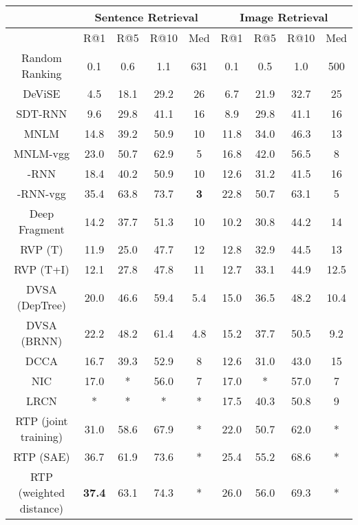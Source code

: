 \documentclass[10pt,twocolumn,letterpaper]{article}
\begin{document}
\begin{table*} \small
\begin{center}
\begin{tabular}{c|cccc|cccc}
    \hline
          & \multicolumn{4}{|c|}{Sentence Retrieval} & \multicolumn{4}{|c}{Image Retrieval}  \\
          \hline
          \hline
        & R@1 & R@5 & R@10 & Med  & R@1 & R@5 & R@10 & Med  \\
        \hline
        \hline
        Random Ranking & 0.1 & 0.6 & 1.1 & 631 & 0.1 & 0.5  & 1.0 & 500\\
DeViSE \cite{frome_nips2013}& 4.5 & 18.1 & 29.2 & 26 & 6.7 & 21.9  & 32.7 & 25\\
SDT-RNN \cite{socher_tacl2014}& 9.6 & 29.8 & 41.1 & 16 & 8.9 & 29.8  & 41.1 & 16\\
MNLM \cite{kiros_2014}& 14.8 & 39.2 & 50.9 & 10 & 11.8 & 34.0  & 46.3 & 13\\
MNLM-vgg \cite{kiros_2014}& 23.0 & 50.7 & 62.9 & 5 & 16.8 & 42.0  & 56.5 & 8\\
-RNN \cite{mao_2014}& 18.4 & 40.2 & 50.9 & 10 & 12.6 & 31.2  & 41.5 & 16\\
-RNN-vgg \cite{mao_iclr_2015}& {35.4} & {63.8} & {73.7} & \textbf{3} & {22.8} & {50.7}  & {63.1} & {5}\\
Deep Fragment  \cite{karpathy_2014}& 14.2 & 37.7 & 51.3 &10 & 10.2 & 30.8  & 44.2 & 14\\
RVP (T) \cite{chen_2014}& 11.9 & 25.0 & 47.7 & 12 & 12.8 & 32.9  & 44.5 & 13\\
RVP (T+I) \cite{chen_2014}& 12.1 & 27.8 & 47.8 & 11 & 12.7 & 33.1  & 44.9 & 12.5\\
DVSA (DepTree)  \cite{karpathy_dvsa_2014}& 20.0 & 46.6 & 59.4 & 5.4 & 15.0 & 36.5  & 48.2 & 10.4\\
DVSA (BRNN)  \cite{karpathy_dvsa_2014}& 22.2 & 48.2 & 61.4 & 4.8 & 15.2 & 37.7  & 50.5 & 9.2\\
DCCA \cite{yan_cvpr2015} & 16.7 & 39.3 & 52.9 & 8 & 12.6 & 31.0 & 43.0 & 15 \\
NIC \cite{vinyals_2014}& 17.0 & * & 56.0 & 7 & 17.0 & *  & 57.0 & 7\\
LRCN \cite{donahue_2014}& * & * & * & * & 17.5 & 40.3  & 50.8 & 9\\


        RTP (joint training) \cite{plummer_2015} & 31.0 & 58.6 & 67.9 & * & 22.0 & 50.7 & 62.0 & * \\
        RTP (SAE) \cite{plummer_2015} & 36.7 & 61.9 & 73.6 & * & 25.4 & 55.2 & 68.6 & *\\
        RTP (weighted distance) \cite{plummer_2015} & \textbf{37.4} & 63.1 & 74.3 & * & 26.0 & 56.0 & 69.3 & * \\


\end{tabular}
\end{center}
\end{table*}
\end{document}
